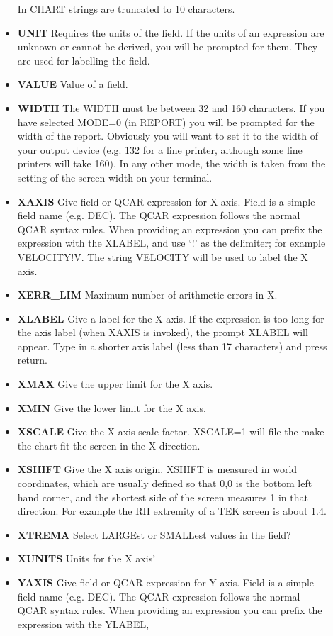 \begin{description}
\begin{itemize}
In CHART strings are truncated to 10 characters.
\item{\bf UNIT} Requires the units of the field.
If the units of an expression are unknown or cannot be derived, you will
be prompted for them.
They are used for labelling the field.
\item{\bf VALUE} Value of a field.
\item{\bf WIDTH} The WIDTH must be between 32 and 160 characters.
If you have selected MODE=0 (in REPORT) you will be prompted for the width
of the report.
Obviously you will want to set it to the width of your output device
(e.g. 132 for a line printer, although some line printers will take 160).
In any other mode, the width is taken from the setting of the screen width
on your terminal.
\item{\bf XAXIS} Give field or QCAR expression for X axis.
Field is a simple field name (e.g. DEC).
The QCAR expression follows the normal QCAR syntax rules.
When providing an expression you can prefix the expression with the XLABEL,
and use `!' as the delimiter; for example VELOCITY!V.
The string VELOCITY will be used to label the X axis.
\item {\bf XERR\_LIM} Maximum number of arithmetic errors in X.
\item{\bf XLABEL} Give a label for the X axis.
If the expression is too long for the axis label (when XAXIS is invoked),
the prompt XLABEL will appear.
Type in a shorter axis label (less than 17 characters) and press return.
\item{\bf XMAX} Give the upper limit for the X axis.
\item{\bf XMIN} Give the lower limit for the X axis.
\item{\bf XSCALE} Give the X axis scale factor.
XSCALE=1 will file the make the chart fit the screen in the X direction.
\item{\bf XSHIFT} Give the X axis origin.
XSHIFT is measured in world coordinates,  which are usually defined so that
0,0 is the bottom left hand corner, and the shortest side of the screen
measures 1 in that direction.
For example the RH extremity of a TEK screen is about 1.4.
\item{\bf XTREMA} Select LARGEst or SMALLest values in the field?
\item{\bf XUNITS} Units for the X axis'
\item{\bf YAXIS} Give field or QCAR expression for Y axis.
Field is a simple field name (e.g. DEC).
The QCAR expression follows the normal QCAR syntax rules.
When providing an expression you can prefix the expression with the YLABEL,

\end{itemize}
\end{description}
